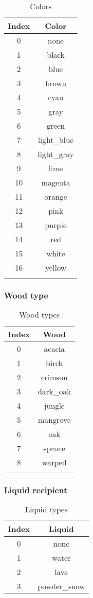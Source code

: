 \begin{longtable}{ |c|c| }
	\hline
	Index & Color \\
	\hline
	\endhead
	0 & none \\
	1 & black \\
	2 & blue \\
	3 & brown \\
	4 & cyan \\
	5 & gray \\
	6 & green \\
	7 & light\_blue \\
	8 & light\_gray \\
	9 & lime \\
	10 & magenta \\
	11 & orange \\
	12 & pink \\
	13 & purple \\
	14 & red \\
	15 & white \\
	16 & yellow \\
	\hline
	\caption{Colors}
\end{longtable}

\subsubsection{Wood type}\label{ab:wood}

\begin{longtable}{ |c|c| }
	\hline
	Index & Wood \\
	\hline
	\endhead
	0 & acacia \\
	1 & birch \\
	2 & crimson \\
	3 & dark\_oak \\
	4 & jungle \\
	5 & mangrove \\
	6 & oak \\
	7 & spruce \\
	8 & warped \\
	\hline
	\caption{Wood types}
\end{longtable}


\subsubsection{Liquid recipient}

\begin{table}[H]
	\centering
	\begin{tabular}{ |c|c| }
		\hline
		Index & Liquid \\
		\hline
		0 & none \\
		1 & water \\
		2 & lava \\
		3 & powder\_snow \\
		\hline
	\end{tabular}
	\caption{Liquid types}
\end{table}

